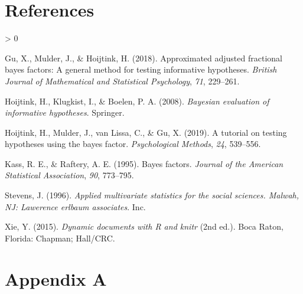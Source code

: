 \documentclass[
]{book}
\newlength{\cslhangindent}
\newenvironment{CSLReferences}[2] %
 {%
  \setlength{\parindent}{0pt}
  \ifodd #1 \everypar{\setlength{\hangindent}{\cslhangindent}}\ignorespaces\fi
  \ifnum #2 > 0
  \setlength{\parskip}{#2\baselineskip}
  \fi
 }%
 {}
\begin{document}
\hypertarget{references}{%
\chapter*{References}\label{references}}

\hypertarget{refs}{}
\begin{CSLReferences}{1}{0}
\leavevmode\hypertarget{ref-gu2018approximated}{}%
Gu, X., Mulder, J., \& Hoijtink, H. (2018). Approximated adjusted fractional bayes factors: A general method for testing informative hypotheses. \emph{British Journal of Mathematical and Statistical Psychology}, \emph{71}, 229--261.

\leavevmode\hypertarget{ref-hoijtink2008bayesian}{}%
Hoijtink, H., Klugkist, I., \& Boelen, P. A. (2008). \emph{Bayesian evaluation of informative hypotheses}. Springer.

\leavevmode\hypertarget{ref-e575e990fdef4c469a1c19a210d58e2f}{}%
Hoijtink, H., Mulder, J., van Lissa, C., \& Gu, X. (2019). A tutorial on testing hypotheses using the bayes factor. \emph{Psychological Methods}, \emph{24}, 539--556.

\leavevmode\hypertarget{ref-kass1995bayes}{}%
Kass, R. E., \& Raftery, A. E. (1995). Bayes factors. \emph{Journal of the American Statistical Association}, \emph{90}, 773--795.

\leavevmode\hypertarget{ref-stevens1996applied}{}%
Stevens, J. (1996). \emph{Applied multivariate statistics for the social sciences. Malwah, NJ: Lawerence erlbaum associates}. Inc.

\leavevmode\hypertarget{ref-xie2015}{}%
Xie, Y. (2015). \emph{Dynamic documents with {R} and knitr} (2nd ed.). Boca Raton, Florida: Chapman; Hall/CRC.

\end{CSLReferences}

\hypertarget{appendix-appendix}{%
\appendix}


\hypertarget{appendix-a}{%
\chapter*{Appendix A}\label{appendix-a}}
\end{document}
